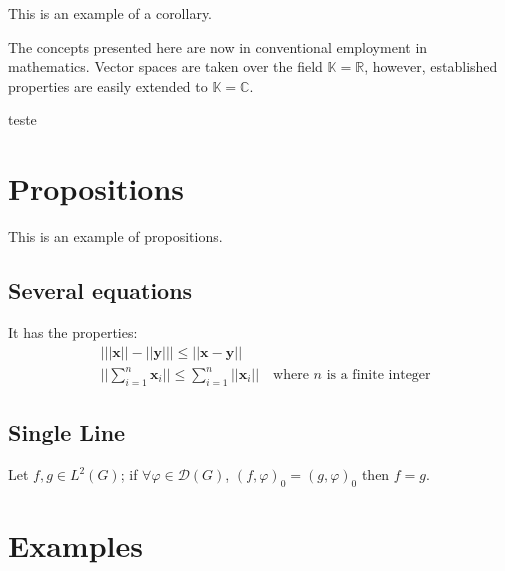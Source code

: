 \documentclass[11pt,fleqn]{book} %
\begin{document}
This is an example of a corollary.

\begin{corollary}
The concepts presented here are now in conventional employment in mathematics. Vector spaces are taken over the field $\mathbb{K}=\mathbb{R}$, however, established properties are easily extended to $\mathbb{K}=\mathbb{C}$.
\end{corollary}


\begin{corollary}
teste
\end{corollary}

\section{Propositions}

This is an example of propositions.

\subsection{Several equations}

\begin{proposition}
It has the properties:
\begin{align}
& \big| ||\mathbf{x}|| - ||\mathbf{y}|| \big|\leq || \mathbf{x}- \mathbf{y}||\\
&  ||\sum_{i=1}^n\mathbf{x}_i||\leq \sum_{i=1}^n||\mathbf{x}_i||\quad\text{where $n$ is a finite integer}
\end{align}
\end{proposition}

\subsection{Single Line}

\begin{proposition} 
Let $f,g\in L^2(G)$; if $\forall \varphi\in\mathcal{D}(G)$, $(f,\varphi)_0=(g,\varphi)_0$ then $f = g$. 
\end{proposition}


\section{Examples}
\end{document}
